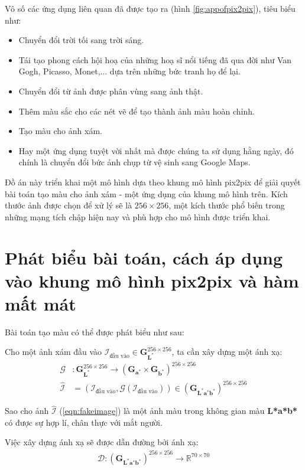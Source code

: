 \documentclass[a4paper, 12pt]{report}
\begin{document}
Vô số các ứng dụng liên quan đã được tạo ra (hình \ref{fig:appofpix2pix}), tiêu biểu như:

\begin{itemize}
    \item Chuyển đổi trời tối sang trời sáng.
    \item Tái tạo phong cách hội hoạ của những hoạ sĩ nổi tiếng đã qua đời như Van Gogh, Picasso, Monet,... dựa trên những bức tranh họ để lại.
    \item Chuyển đổi từ ảnh được phân vùng sang ảnh thật.
    \item Thêm màu sắc cho các nét vẽ để tạo thành ảnh màu hoàn chỉnh.
    \item Tạo màu cho ảnh xám.
    \item Hay một ứng dụng tuyệt vời nhất mà được chúng ta sử dụng hằng ngày, đó chính là chuyển đổi bức ảnh chụp từ vệ sinh sang Google Maps.
\end{itemize}

Đồ án này triển khai một mô hình dựa theo khung mô hình pix2pix để giải quyết bài toán tạo màu cho ảnh xám - một ứng dụng của khung mô hình trên.
Kích thước ảnh được chọn để xử lý sẽ là $256 \times 256$, một kích thước phổ biến trong những mạng tích chập hiện nay và phù hợp cho mô hình được triển khai.

\section{Phát biểu bài toán, cách áp dụng vào khung mô hình pix2pix và hàm mất mát}

Bài toán tạo màu có thể được phát biểu như sau:

\begin{tcolorbox}
Cho một ảnh xám đầu vào $\mathcal{I}_{\text{đầu vào}} \in \bm{G}_{\mathbf{L}^*}^{256 \times 256}$, ta cần xây dựng một ánh xạ:
\begin{align}
    \mathcal{G}&: \bm{G}_{\mathbf{L}^*}^{256 \times 256} \rightarrow \left(\bm{G}_{\mathbf{a}^*} \times \bm{G}_{\mathbf{b}^*}\right)^{256 \times 256}\\
    \widehat{\mathcal{I}} &= \left(\mathcal{I}_{\text{đầu vào}}, \mathcal{G}\left(\mathcal{I}_{\text{đầu vào}}\right)\right) \in \left(\bm{G}_{\mathbf{L^*}\mathbf{a^*}\mathbf{b^*}}\right)^{256 \times 256}\label{eqn:fakeimage}
\end{align}

Sao cho ảnh $\widehat{\mathcal{I}}$ (\ref{eqn:fakeimage}) là một ảnh màu trong không gian màu \textbf{L*a*b*} có được sự hợp lí, chân thực với mắt người.\vspace{5pt}

Việc xây dựng ánh xạ sẽ được dẫn đường bởi ánh xạ:
\begin{align}
    \mathcal{D}:\left(\bm{G}_{\mathbf{L^*}\mathbf{a^*}\mathbf{b^*}}\right)^{256 \times 256} \rightarrow \mathbb{R}^{70 \times 70}
\end{align}

\end{tcolorbox}
\end{document}
